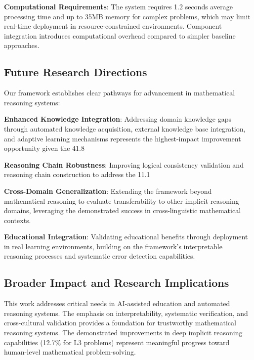 \textbf{Computational Requirements}: The system requires 1.2 seconds average processing time and up to 35MB memory for complex problems, which may limit real-time deployment in resource-constrained environments. Component integration introduces computational overhead compared to simpler baseline approaches.

\subsection{Future Research Directions}

Our framework establishes clear pathways for advancement in mathematical reasoning systems:

\textbf{Enhanced Knowledge Integration}: Addressing domain knowledge gaps through automated knowledge acquisition, external knowledge base integration, and adaptive learning mechanisms represents the highest-impact improvement opportunity given the 41.8%

\textbf{Reasoning Chain Robustness}: Improving logical consistency validation and reasoning chain construction to address the 11.1%

\textbf{Cross-Domain Generalization}: Extending the framework beyond mathematical reasoning to evaluate transferability to other implicit reasoning domains, leveraging the demonstrated success in cross-linguistic mathematical contexts.

\textbf{Educational Integration}: Validating educational benefits through deployment in real learning environments, building on the framework's interpretable reasoning processes and systematic error detection capabilities.

\subsection{Broader Impact and Research Implications}

This work addresses critical needs in AI-assisted education and automated reasoning systems. The emphasis on interpretability, systematic verification, and cross-cultural validation provides a foundation for trustworthy mathematical reasoning systems. The demonstrated improvements in deep implicit reasoning capabilities (12.7\% for L3 problems) represent meaningful progress toward human-level mathematical problem-solving.

